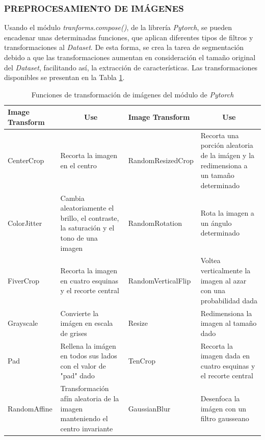 \subsubsection{PREPROCESAMIENTO DE IMÁGENES}

Usando el módulo \textit{tranforms.compose()}, de la librería \textit{Pytorch}, se pueden encadenar unas determinadas funciones, que aplican diferentes tipos de filtros y transformaciones al \textit{Dataset}. De esta forma, se crea la tarea de segmentación debido a que las transformaciones aumentan en consideración el tamaño original del \textit{Dataset}, facilitando así, la extracción de características. Las transformaciones disponibles se presentan en la Tabla \ref{table:Filters1}.

\begin{table}[ht]
	\centering
	\begin{tabular}{|p{3cm}|p{4cm}|p{3.8cm}|p{4cm}|}
		\hline
		Image Transform       & \multicolumn{1}{c|}{Use}                                                               & Image Transform       & \multicolumn{1}{c|}{Use}                                                                        \\ \hline
		CenterCrop            & Recorta la imagen en el centro                                                         & RandomResizedCrop     & Recorta una porción aleatoria de la imágen y la redimensiona a un tamaño determinado            \\ \hline
		ColorJitter           & Cambia aleatoriamente el brillo, el contraste, la saturación y el tono de una imagen   & RandomRotation        & Rota la imagen a un ángulo determinado                                                          \\ \hline
		FiverCrop              & Recorta la imagen en cuatro esquinas y el recorte central                              & RandomVerticalFlip    & Voltea verticalmente la imagen al azar con una probabilidad dada                                \\ \hline
		Grayscale             & Convierte la imágen en escala de grises                                                & Resize                & Redimensiona la imagen al tamaño dado                                                           \\ \hline
		Pad                   & Rellena la imágen en todos sus lados con el valor de "pad" dado                        & TenCrop               & Recorta la imagen dada en cuatro esquinas y el recorte central \\ \hline
		RandomAffine          & Transformación afín aleatoria de la imagen manteniendo el centro invariante            & GaussianBlur          & Desenfoca la imágen con un filtro gausseano                                                                                                                     \\ \hline
	\end{tabular}
	\caption{Funciones de transformación de imágenes del módulo de \textit{Pytorch}}
	\label{table:Filters1}
\end{table}

